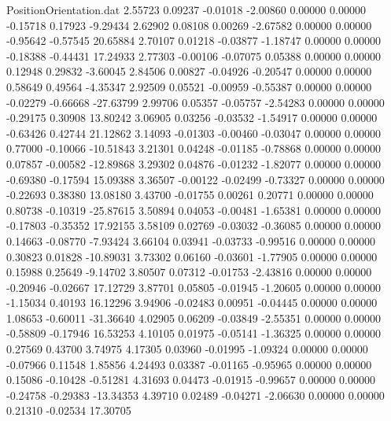 \begin{filecontents}{PositionOrientation.dat}
   2.55723    0.09237   -0.01018    -2.00860    0.00000    0.00000   -0.15718    0.17923   -9.29434
   2.62902    0.08108    0.00269    -2.67582    0.00000    0.00000   -0.95642   -0.57545   20.65884
   2.70107    0.01218   -0.03877    -1.18747    0.00000    0.00000   -0.18388   -0.44431   17.24933
   2.77303   -0.00106   -0.07075     0.05388    0.00000    0.00000    0.12948    0.29832   -3.60045
   2.84506    0.00827   -0.04926    -0.20547    0.00000    0.00000    0.58649    0.49564   -4.35347
   2.92509    0.05521   -0.00959    -0.55387    0.00000    0.00000   -0.02279   -0.66668  -27.63799
   2.99706    0.05357   -0.05757    -2.54283    0.00000    0.00000   -0.29175    0.30908   13.80242
   3.06905    0.03256   -0.03532    -1.54917    0.00000    0.00000   -0.63426    0.42744   21.12862
   3.14093   -0.01303   -0.00460    -0.03047    0.00000    0.00000    0.77000   -0.10066  -10.51843
   3.21301    0.04248   -0.01185    -0.78868    0.00000    0.00000    0.07857   -0.00582  -12.89868
   3.29302    0.04876   -0.01232    -1.82077    0.00000    0.00000   -0.69380   -0.17594   15.09388
   3.36507   -0.00122   -0.02499    -0.73327    0.00000    0.00000   -0.22693    0.38380   13.08180
   3.43700   -0.01755    0.00261     0.20771    0.00000    0.00000    0.80738   -0.10319  -25.87615
   3.50894    0.04053   -0.00481    -1.65381    0.00000    0.00000   -0.17803   -0.35352   17.92155
   3.58109    0.02769   -0.03032    -0.36085    0.00000    0.00000    0.14663   -0.08770   -7.93424
   3.66104    0.03941   -0.03733    -0.99516    0.00000    0.00000    0.30823    0.01828  -10.89031
   3.73302    0.06160   -0.03601    -1.77905    0.00000    0.00000    0.15988    0.25649   -9.14702
   3.80507    0.07312   -0.01753    -2.43816    0.00000    0.00000   -0.20946   -0.02667   17.12729
   3.87701    0.05805   -0.01945    -1.20605    0.00000    0.00000   -1.15034    0.40193   16.12296
   3.94906   -0.02483    0.00951    -0.04445    0.00000    0.00000    1.08653   -0.60011  -31.36640
   4.02905    0.06209   -0.03849    -2.55351    0.00000    0.00000   -0.58809   -0.17946   16.53253
   4.10105    0.01975   -0.05141    -1.36325    0.00000    0.00000    0.27569    0.43700    3.74975
   4.17305    0.03960   -0.01995    -1.09324    0.00000    0.00000   -0.07966    0.11548    1.85856
   4.24493    0.03387   -0.01165    -0.95965    0.00000    0.00000    0.15086   -0.10428   -0.51281
   4.31693    0.04473   -0.01915    -0.99657    0.00000    0.00000   -0.24758   -0.29383  -13.34353
   4.39710    0.02489   -0.04271    -2.06630    0.00000    0.00000    0.21310   -0.02534   17.30705

\end{filecontents}
